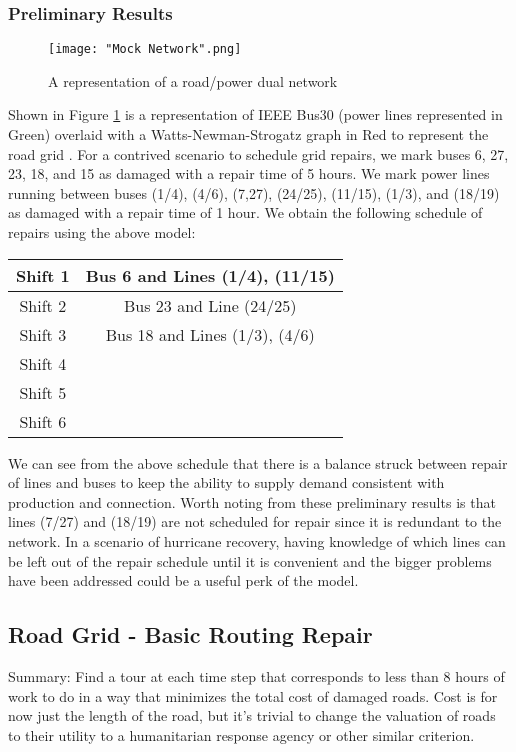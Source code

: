 \documentclass{article}
\begin{document}
	\subsubsection{Preliminary Results}
	\begin{figure}
	\texttt{[image: "Mock Network".png]}
	\caption{A representation of a road/power dual network} \label{mocknetwork}
	\end{figure}
	Shown in Figure \ref{mocknetwork} is a representation of IEEE Bus30 (power lines represented in Green) overlaid with a Watts-Newman-Strogatz graph in Red to represent the road grid \cite{NewmanEA2001}. For a contrived scenario to schedule grid repairs, we mark buses 6, 27, 23, 18, and 15 as damaged with a repair time of 5 hours. We mark power lines running between buses (1/4), (4/6), (7,27), (24/25), (11/15), (1/3), and (18/19) as damaged with a repair time of 1 hour. We obtain the following schedule of repairs using the above model:\newline

		{\centering
	\begin{tabular}{|c|c|}
		\hline
		Shift 1 & Bus 6 and Lines (1/4), (11/15) \\
		\hline
		Shift 2 & Bus 23 and Line (24/25) \\
		\hline
		Shift 3 & Bus 18 and Lines (1/3), (4/6)\\
		\hline
		Shift 4 &  \\
		\hline
		Shift 5 &  \\
		\hline
		Shift 6 &  \\
		\hline
	\end{tabular}\par
}
	
	We can see from the above schedule that there is a balance struck between repair of lines and buses to keep the ability to supply demand consistent with production and connection. Worth noting from these preliminary results is that lines (7/27) and (18/19) are not scheduled for repair since it is redundant to the network. In a scenario of hurricane recovery, having knowledge of which lines can be left out of the repair schedule until it is convenient and the bigger problems have been addressed could be a useful perk of the model. 
	  
	\subsection{Road Grid - Basic Routing Repair}
	Summary: Find a tour at each time step that corresponds to less than 8 hours of work to do in a way that minimizes the total cost of damaged roads. Cost is for now just the length of the road, but it's trivial to change the valuation of roads to their utility to a humanitarian response agency or other similar criterion.
	
\end{document}
